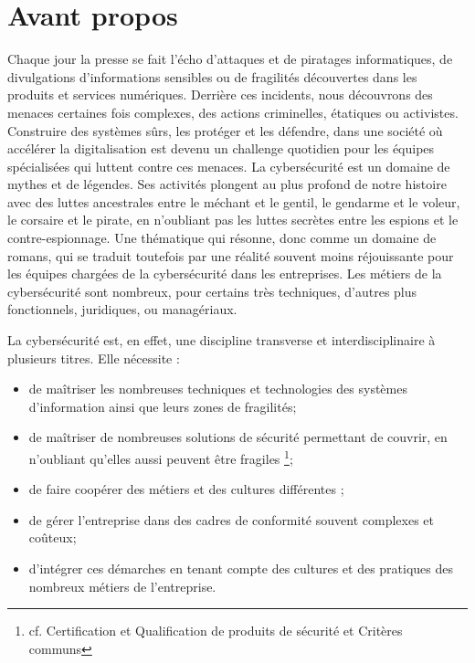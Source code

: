 %
%


\section{Avant propos}

Chaque jour la presse se fait l'écho d'attaques et de piratages informatiques, de divulgations d'informations sensibles ou  de fragilités découvertes dans les produits et services numériques.
Derrière ces incidents, nous découvrons des menaces certaines fois complexes, des actions criminelles, étatiques ou activistes. Construire des systèmes sûrs, les protéger et les défendre, dans une société où accélérer la digitalisation est devenu un challenge quotidien pour les équipes spécialisées qui luttent contre ces menaces. 
La cybersécurité est un domaine de mythes et de légendes. Ses activités plongent au plus profond de notre histoire avec des luttes ancestrales entre le méchant et le gentil, le gendarme et le voleur, le corsaire et le pirate, en n'oubliant pas les luttes secrètes entre les espions et le contre-espionnage. Une thématique qui résonne, donc comme un domaine de romans, qui se traduit toutefois par une réalité souvent moins réjouissante pour les équipes chargées de la cybersécurité dans les entreprises. Les métiers de la cybersécurité sont nombreux, pour certains très techniques, d'autres plus fonctionnels, juridiques, ou managériaux. 

La cybersécurité est, en effet,  une discipline transverse et interdisciplinaire à plusieurs titres. Elle nécessite  :
\begin{itemize}
  \item de maîtriser les nombreuses techniques et technologies des systèmes d'information ainsi que leurs zones de fragilités;
  \item de maîtriser de nombreuses solutions de sécurité permettant de couvrir, en n'oubliant qu'elles aussi peuvent être fragiles \footnote{cf. Certification et Qualification de produits de sécurité et Critères communs };

  \item de faire coopérer des métiers et des cultures différentes ;
  \item de gérer l'entreprise dans des cadres de conformité souvent complexes et coûteux;
  \item d'intégrer ces démarches en tenant compte des cultures et des pratiques des nombreux métiers de l'entreprise.
\end{itemize}

